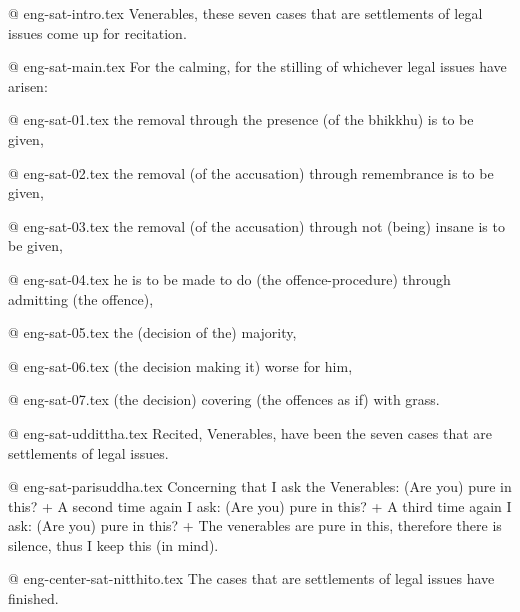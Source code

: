 @ eng-sat-intro.tex
Venerables, these seven cases that are settlements of legal issues come up for recitation.

@ eng-sat-main.tex
For the calming, for the stilling of whichever legal issues have arisen: 

@ eng-sat-01.tex
the removal through the presence (of the bhikkhu) is to be given,

@ eng-sat-02.tex
the removal (of the accusation) through remembrance is to be given,

@ eng-sat-03.tex
the removal (of the accusation) through not (being) insane is to be given,

@ eng-sat-04.tex
he is to be made to do (the offence-procedure) through admitting (the offence),

@ eng-sat-05.tex
the (decision of the) majority,

@ eng-sat-06.tex
(the decision making it) worse for him,

@ eng-sat-07.tex
(the decision) covering (the offences as if) with grass.

@ eng-sat-uddittha.tex
Recited, Venerables, have been the seven cases that are settlements of legal issues.

@ eng-sat-parisuddha.tex
Concerning that I ask the Venerables: (Are you) pure in this? +
A second time again I ask: (Are you) pure in this? +
A third time again I ask: (Are you) pure in this? +
The venerables are pure in this, therefore there is silence, thus I keep this (in mind).

@ eng-center-sat-nitthito.tex
The cases that are settlements of legal issues have finished.
